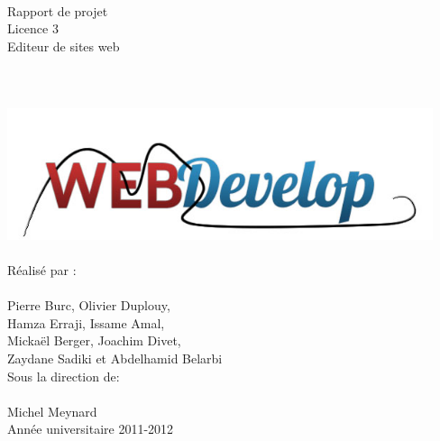 \documentclass[a4paper, 12pt]{report}
\begin{document}
	\begin{titlepage}
		\\ 
		~\\
		~\\
		~\\
		~\\
		~\\		
		\begin{center}
			{\large Rapport de projet} \\
			{\large Licence 3}\\
			\vspace{1,5cm}
			{\Huge Editeur de sites web}\\
			~\\
			~\\
			~\\
			\includegraphics[width=12.5cm]{images/logoTest1.png}
			~\\
			~\\
			{\large Réalisé par :} \\
			~\\
			{\LARGE Pierre Burc, Olivier Duplouy, \\
				      Hamza Erraji, Issame Amal,\\
				      Mickaël Berger, Joachim Divet,\\
				      Zaydane Sadiki et Abdelhamid Belarbi}\\
			\vspace{1,5cm}
			{\large Sous la direction de:} \\
			~\\
			{\LARGE Michel Meynard} \\
			\vspace{2.5cm}
			{\large Année universitaire 2011-2012 }			
		\end{center}
	\end{titlepage}
\end{document}
